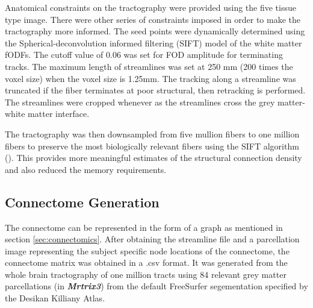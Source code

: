 \documentclass[msthesis.tex]{subfiles}
\begin{document}
Anatomical constraints on the tractography were provided using the five tissue type image. There were other series of constraints imposed in order to make the  tractography more informed. The seed points were dynamically determined using the Spherical-deconvolution informed filtering (SIFT) model \cite{smith2013sift} of the white matter fODFs. The cutoff value of 0.06 was set for FOD amplitude for terminating tracks. The maximum length of streamlines was set at 250 mm (200 times the voxel size) when the voxel size is 1.25mm. The tracking along a streamline was truncated if the fiber terminates at poor structural, then  retracking is performed. The streamlines were cropped whenever as the streamlines cross the grey matter-white matter interface. 

The tractography was then downsampled from five mullion fibers to one million fibers to preserve the most biologically relevant fibers using the SIFT algorithm (\cite{smith2013sift}). This provides more meaningful estimates of the structural connection density and also reduced the memory requirements. 

\subsection{Connectome Generation}

The connectome can be represented in the form of a graph as mentioned in section \ref{sec:connectomics}. After obtaining the streamline file and a parcellation image representing the subject specific node locations of the connectome, the connectome matrix was obtained in a .csv format. It was generated from the whole brain tractography of one million tracts using 84 relevant grey matter parcellations (in \textit{\textbf{Mrtrix3}}) from the default FreeSurfer segementation specified by the Desikan Killiany Atlas. 
\end{document}
